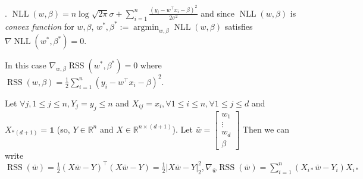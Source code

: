 \documentclass[8pt]{beamer}
\newcommand{\mbb}[1]{\mathbb{#1}}
\newcommand{\mb}[1]{\mathbf{#1}}
\newcommand{\ti}[1]{\textit{#1}}
\newcommand{\abs}[1]{\left\lvert #1 \right\rvert}
\newcommand{\argmin}[1]{\operatorname{arg min}_{#1}}
\newcommand{\nll}[1]{\operatorname{NLL}\!\left(#1\right)}
\newcommand{\rss}[1]{\operatorname{RSS}\!\left(#1\right)}
\begin{document}
\begin{frame}{.}
  $\nll{w, \beta} = n \log{\sqrt{2\pi}\sigma} + \sum_{i=1}^n \frac{(y_i - w^\top x_i - \beta)^2}{2\sigma^2}$ and since $\nll{w, \beta}$ is \ti{convex function} for $w, \beta$, $w^\ast, \beta^\ast := \argmin{w, \beta} \nll{w, \beta}$ satisfies $\nabla \nll{w^\ast, \beta^\ast} = 0$.

  In this case $\nabla_{w, \beta} \rss{w^\ast, \beta^\ast} = 0$ where $\rss{w, \beta} = \frac{1}{2}\sum_{i=1}^n (y_i - w^\top x_i - \beta)^2$.

  \bigskip
  Let $\forall j, 1 \leq j \leq n, Y_j = y_j \leq n$ and $X_{ij} = x_i, \forall 1 \leq i\leq n, \forall 1 \leq j \leq d$ and $X_{*(d+1)} = \mb{1}$ (so, $Y \in \mbb{R}^{n}$ and $X \in \mbb{R}^{n \times (d+1)}$). Let $\bar{w} = \left[\begin{matrix} w_1 \\ \vdots \\ w_d \\ \beta  \end{matrix}\right]$ Then we can write $\rss{\bar{w}} = \frac{1}{2} (X\bar{w} - Y)^\top (X\bar{w} - Y) =\frac{1}{2}\abs{X\bar{w} - Y}^2_2, \nabla_{\bar{w}}\rss{\bar{w}} = \sum_{i=1}^n (X_{i*} \bar{w} - Y_i) X_{i*}$
\end{frame}
\end{document}
